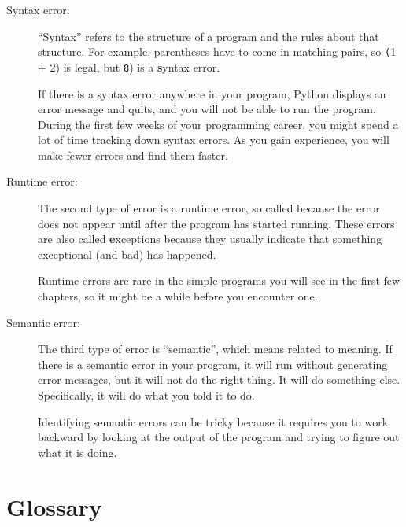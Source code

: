 \documentclass[
DIV=11,
fontsize=13,
twoside,
headinclude=false,
titlepage=firstiscover,
abstract=true,
headsepline=true,
footsepline=true,
chapterprefix=true, %
headings=big,
bibliography=totoc,%
captions=tableheading
]{scrbook}
\theoremstyle{definition}
\begin{document}
\begin{description}

\item[Syntax error:] ``Syntax'' refers to the structure of a program
  and the rules about that structure.  For example, parentheses have
  to come in matching pairs, so {\texttt (1 + 2)} is legal, but {\texttt 8)}
  is a {\textbf syntax error}.   

If there is a syntax error
anywhere in your program, Python displays an error message and quits,
and you will not be able to run the program.  During the first few
weeks of your programming career, you might spend a lot of
time tracking down syntax errors.  As you gain experience, you will
make fewer errors and find them faster.


\item[Runtime error:] The second type of error is a runtime error, so
  called because the error does not appear until after the program has
  started running.  These errors are also called {\textbf exceptions}
  because they usually indicate that something exceptional (and bad)
  has happened.   
    

Runtime errors are rare in the simple programs you will see in the
first few chapters, so it might be a while before you encounter one.


\item[Semantic error:] The third type of error is ``semantic'', which
  means related to meaning.  If there is a semantic error in your
  program, it will run without generating error messages, but it will
  not do the right thing.  It will do something else.  Specifically,
  it will do what you told it to do.  
   

Identifying semantic errors can be tricky because it requires you to work
backward by looking at the output of the program and trying to figure
out what it is doing.

\end{description}


\section{Glossary}
\end{document}
